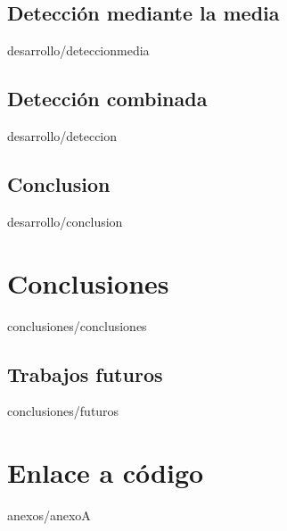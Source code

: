 \documentclass[epsbased,copyright,final,printable,covers,extendedindex,firstnumbered,tfg,gnuplot]{tfgtfmthesisuam}
\begin{document}
  \section{Detección mediante la media\label{SEC:DETECCIONMEDIA}}{desarrollo/deteccionmedia}
  \section{Detección combinada\label{SEC:DETECCION}}{desarrollo/deteccion}
  \section{Conclusion\label{SEC:DPCONCLUSION}}{desarrollo/conclusion}
\chapter{Conclusiones\label{CAP:CONCLUSIONES}}{conclusiones/conclusiones}
  \section{Trabajos futuros\label{SEC:FUTUROS}}{conclusiones/futuros}

\appendix

\chapter{Enlace a código\label{CAP:ANEXOA}}{anexos/anexoA}
\end{document}
